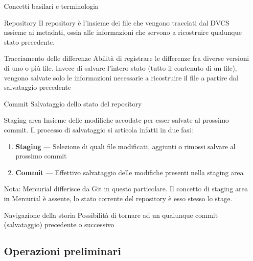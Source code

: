\documentclass[presentation]{beamer}
\begin{document}
\begin{frame}[allowframebreaks]{Concetti basilari e terminologia}
	\begin{block}{Repository}
		Il repository è l'insieme dei file che vengono tracciati dal DVCS assieme ai metadati, ossia 
alle informazioni che servono a ricostruire qualunque stato precedente.
	\end{block}
	\begin{block}{Tracciamento delle differenze}
		Abilità di registrare le differenze fra diverse versioni di uno o più file. Invece di 
salvare l'intero stato (tutto il contenuto di un file), vengono salvate solo le informazioni 
necessarie a ricostruire il file a partire dal salvataggio precedente
	\end{block}
	\begin{block}{Commit}
		Salvataggio dello stato del repository
	\end{block}
	\begin{block}{Staging area}
		Insieme delle modifiche accodate per esser salvate al prossimo commit. Il processo di 
salvataggio si articola infatti in due fasi:
		\begin{enumerate}
			\item \textbf{Staging} --- Selezione di quali file modificati, aggiunti o rimossi 
salvare al prossimo commit
			\item \textbf{Commit} --- Effettivo salvataggio delle modifiche presenti nella staging 
area
		\end{enumerate}
		Nota: Mercurial differisce da Git in questo particolare. Il concetto di staging area in 
Mercurial è assente, lo stato corrente del repository è esso stesso lo stage.
	\end{block}
	\begin{block}{Navigazione della storia}
		Possibilità di tornare ad un qualunque commit (salvataggio) precedente o successivo
	\end{block}
\end{frame}

\subsection{Operazioni preliminari}
\end{document}
